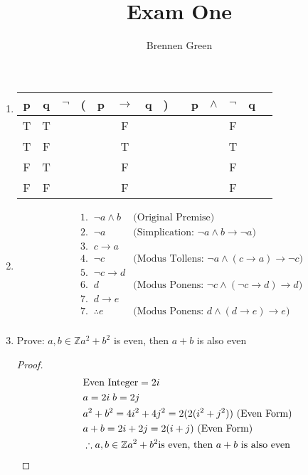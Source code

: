 \documentclass[11pt]{article}
\begin{document}
\title{Exam One}
\author{Brennen Green}
\maketitle


\begin{enumerate}
    \item
    \begin{tabular}{@{ }c@{ }@{ }c | c@{ }@{}c@{}@{ }c@{ }@{ }c@{ }@{ }c@{ }@{}c@{ } | c@{ }@{ }c@{ }@{ }c@{ }@{ }c@{ }@{ }c@{ }@{ }c}
        p & q & $\neg$ & ( & p & $\rightarrow$ & q & ) &  & p & $\wedge$ & $\neg$ &q& \\
        \hline 
        T & T &  &  &  & F &  &  &  &   &  & F &  & \\
        T & F &  &  &  & T &  &  &  &   &  & T &  & \\
        F & T &  &  &  & F &  &  &  &   &  & F &  & \\
        F & F &  &  &  & F &  &  &  &   &  & F &  & \\
    \end{tabular}
    
    \item 
    \begin{align*}
        & 1. \;\; \neg a \wedge b &\text{(Original Premise)} \\
        & 2. \;\; \neg a & \text{(Simplication: } \neg a \wedge b \rightarrow \neg a) \\
        & 3. \;\; c \rightarrow a \\
        & 4. \;\; \neg c & \text{(Modus Tollens: } \neg a \wedge (c\rightarrow a) \rightarrow \neg c) \\
        & 5. \;\; \neg c \rightarrow d \\
        & 6. \;\; d  & \text{(Modus Ponens: } \neg c \wedge (\neg c \rightarrow d) \rightarrow d) \\
        & 7. \;\; d \rightarrow e \\
        & 7. \;\; \therefore e & \text{(Modus Ponens: } d \wedge (d \rightarrow e) \rightarrow e) \\
    \end{align*}

    \newpage

    \item Prove: $ a,b\in \mathbb{Z} a^2 + b^2$ is even, then $ a + b $ is also even
        \begin{proof}
            \begin{align*}
                & \text{Even Integer} = 2i \\
                & a = 2i \; b = 2j \\
                & a^2 + b^2 = 4i^2 + 4j^2 = 2(2(i^2 + j^2)) \text{  (Even Form)} \\
                & a + b = 2i + 2j = 2(i+j) \text{  (Even Form)} \\
                & \therefore a,b\in \mathbb{Z} a^2 + b^2 \text{is even, then $ a + b $ is also even}
            \end{align*}
        \end{proof}
    


\end{enumerate}
\end{document}

